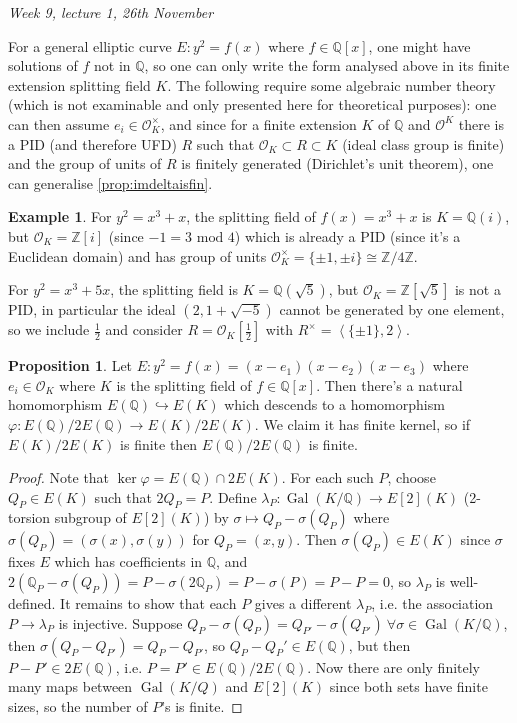 \documentclass{article}
\newcommand{\Z}{\mathbb{Z}}
\newcommand{\Q}{\mathbb{Q}}
\newcommand{\Mod}{\text{ mod }}
\newcommand{\Gal}{\operatorname{Gal}}
\newcommand{\la}{\left\langle}
\newcommand{\ra}{\right\rangle}
\theoremstyle{definition}
\newtheorem{prop}[defn]{Proposition}
\newtheorem{example}[defn]{Example}
\begin{document}
\begin{flushright}
\textit{Week 9, lecture 1, 26th November}
\end{flushright}

For a general elliptic curve $E:y^2=f(x)$ where $f\in\Q[x]$, one might have solutions of $f$ not in $\Q$, so one can only write the form analysed above in its finite extension splitting field $K$. The following require some algebraic number theory (which is not examinable and only presented here for theoretical purposes): one can then assume $e_i\in\mathcal O_K^\times$, and since for a finite extension $K$ of $\Q$ and $\mathcal O^K$ there is a PID (and therefore UFD) $R$ such that $\mathcal O_K\subset R\subset K$ (ideal class group is finite) and the group of units of $R$ is finitely generated (Dirichlet's unit theorem), one can generalise \ref{prop:imdeltaisfin}.

\begin{example}
For $y^2=x^3+x$, the splitting field of $f(x)=x^3+x$ is $K=\Q(i)$, but $\mathcal O_K=\Z[i]$ (since $-1=3\Mod 4$) which is already a PID (since it's a Euclidean domain) and has group of units $\mathcal O_K^\times=\{\pm 1,\pm i\}\cong\Z/4\Z$.

For $y^2=x^3+5x$, the splitting field is $K=\Q(\sqrt 5)$, but $\mathcal O_K=\Z[\sqrt 5]$ is not a PID, in particular the ideal $(2,1+\sqrt{-5})$ cannot be generated by one element, so we include $\frac12$ and consider $R=\mathcal O_K\left[\frac12\right]$ with $R^\times=\la\{\pm 1\},2\ra$.
\end{example}

\begin{prop}
\label{prop:EK2EKfinimpEQ2EQfin}
Let $E:y^2=f(x)=(x-e_1)(x-e_2)(x-e_3)$ where $e_i\in \mathcal O_K$ where $K$ is the splitting field of $f\in\Q[x]$. Then there's a natural homomorphism $E(\Q)\hookrightarrow E(K)$ which descends to a homomorphism $\varphi:E(\Q)/2E(\Q)\rightarrow E(K)/2E(K)$. We claim it has finite kernel, so if $E(K)/2E(K)$ is finite then $E(\Q)/2E(\Q)$ is finite.
\end{prop}
\begin{proof}
Note that $\ker\varphi=E(\Q)\cap 2E(K)$. For each such $P$, choose $Q_P\in E(K)$ such that $2Q_P=P$. Define $\lambda_P:\Gal(K/\Q)\rightarrow E[2](K)$ (2-torsion subgroup of $E[2](K)$) by $\sigma\mapsto Q_P-\sigma(Q_P)$ where $\sigma(Q_P)=(\sigma(x),\sigma(y))$ for $Q_P=(x,y)$. Then $\sigma(Q_P)\in E(K)$ since $\sigma$ fixes $E$ which has coefficients in $\Q$, and $2(\Q_P-\sigma(Q_P))=P-\sigma(2\Q_P)=P-\sigma(P)=P-P=0$, so $\lambda_P$ is well-defined. It remains to show that each $P$ gives a different $\lambda_P$, i.e. the association $P\rightarrow\lambda_P$ is injective. Suppose $Q_P-\sigma(Q_P)=Q_{P'}-\sigma(Q_{P'}) \ \forall\sigma\in\Gal(K/\Q)$, then $\sigma(Q_P-Q_{P'})=Q_P-Q_{P'}$, so $Q_P-Q_P'\in E(\Q)$, but then $P-P'\in 2E(\Q)$, i.e. $P=P'\in E(\Q)/2E(\Q)$. Now there are only finitely many maps between $\Gal(K/Q)$ and $E[2](K)$ since both sets have finite sizes, so the number of $P$'s is finite.
\end{proof}
\end{document}
